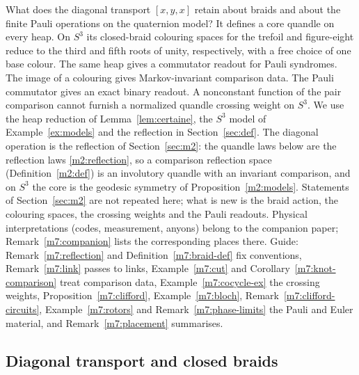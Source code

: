 \documentclass[11pt,reqno]{amsart}
\theoremstyle{definition}
\theoremstyle{remark}
\numberwithin{equation}{section}
\newcommand{\hp}[3]{[#1,#2,#3]}
\begin{document}
What does the diagonal transport $\hp xyx$ retain about braids and about the
finite Pauli operations on the quaternion model? It defines a core quandle on
every heap. On $S^3$ its closed-braid colouring spaces for the trefoil and
figure-eight reduce to the third and fifth roots of unity, respectively, with
a free choice of one base colour. The same heap gives a commutator readout for
Pauli syndromes. The image of a colouring gives Markov-invariant
comparison data. The Pauli commutator gives an exact binary readout. A nonconstant function of
the pair comparison cannot furnish a normalized quandle crossing weight on
$S^3$. We use the heap reduction of Lemma~\ref{lem:certaine}, the $S^3$ model
of Example~\ref{ex:models} and the reflection in Section~\ref{sec:def}.  The diagonal operation is the reflection of
Section~\ref{sec:m2}: the quandle laws below are the reflection laws \eqref{m2:reflection}, so a comparison reflection space
(Definition~\ref{m2:def}) is an involutory quandle with an invariant comparison, and on $S^3$ the core is the geodesic symmetry of
Proposition~\ref{m2:models}.  Statements of Section~\ref{sec:m2} are not repeated here; what is new is the braid action, the
colouring spaces, the crossing weights and the Pauli readouts.  Physical interpretations (codes, measurement, anyons) belong to the
companion paper; Remark~\ref{m7:companion} lists the corresponding places there.  Guide: Remark~\ref{m7:reflection} and Definition~\ref{m7:braid-def} fix
conventions, Remark~\ref{m7:link} passes to links, Example~\ref{m7:cut} and Corollary~\ref{m7:knot-comparison} treat comparison data,
Example~\ref{m7:cocycle-ex} the crossing weights, Proposition~\ref{m7:clifford}, Example~\ref{m7:bloch}, Remark~\ref{m7:clifford-circuits},
Example~\ref{m7:rotors} and Remark~\ref{m7:phase-limits} the Pauli and Euler material, and Remark~\ref{m7:placement} summarises.

\subsection{Diagonal transport and closed braids}
\end{document}
